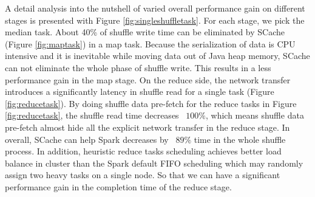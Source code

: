 A detail analysis into the nutshell of varied overall performance gain on different stages is presented with Figure \ref{fig:singleshuffletask}. For each stage, we pick the median task. About 40\% of shuffle write time can be eliminated by SCache (Figure \ref{fig:maptask}) in a map task. Because the serialization of data is CPU intensive \cite{makingsense} and it is inevitable while moving data out of Java heap memory, SCache can not eliminate the whole phase of shuffle write. This results in a less performance gain in the map stage.
On the reduce side, the network transfer introduces a significantly latency in shuffle read for a single task (Figure \ref{fig:reducetask}). By doing shuffle data pre-fetch for the reduce tasks in Figure \ref{fig:reducetask}, the shuffle read time decreases ~$100\%$, which means shuffle data pre-fetch almost hide all the explicit network transfer in the reduce stage. In overall, SCache can help Spark decreases by ~$89\%$ time in the whole shuffle process. In addition, heuristic reduce tasks scheduling achieves better load balance in cluster than the Spark default FIFO scheduling which may randomly assign two heavy tasks on a single node. So that we can have a significant performance gain in the completion time of the reduce stage.
		
